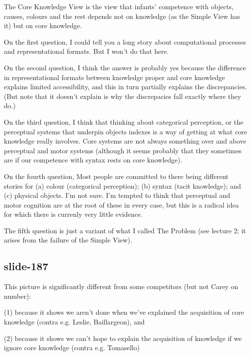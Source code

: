 \documentclass[12pt,\papersize]{extarticle}
\begin{document}
          
 
The Core Knowledge View is the view that infants' competence with objects, causes, colours
and the rest depends not on knowledge (as the Simple View has it) but on core knowledge.
 
On the first question, I could tell you a long story about computational processes and 
representational formats.  But I won't do that here.
 
On the second question, I think the answer is probably yes because the difference in
representational formats between knowledge proper and core knowledge explains limited
accessibility, and this in turn partially explains the discrepancies.
(But note that it doesn't explain is why the discrepacies fall exactly where they do.)
 
On the third question, I think that thinking about categorical perception, or the perceptual 
systems that underpin objects indexes is a way of getting at what core knowledge really 
involves.  Core systems are not always something over and above perceptual and motor systems
(although it seems probably that they sometimes are if our competence with syntax rests on 
core knowledge).
 
On the fourth question,
Most people are committed to there being different stories for (a) colour (categorical 
perception); (b) syntax (tacit knowledge); and (c) physical objects.
I'm not sure. I'm tempted to think that perceptual and motor cognition are at the root of these 
in every case, but this is a radical idea for which there is currenly very little evidence.
 
The fifth question is just a variant of what I called The Problem (see lecture 2; it arises 
from the failure of the Simple View).
 
\subsection{slide-187}
This picture is significantly different from some competitors (but not Carey on number):
 
(1) because it shows we aren't done when we've explained the acquisition of core knowledge (contra e.g. Leslie, Baillargeon), and
 
(2) because it shows we can't hope to explain the acquisition of knowledge if we ignore core knowledge (contra e.g. Tomasello)
 

    
 






\end{document}
